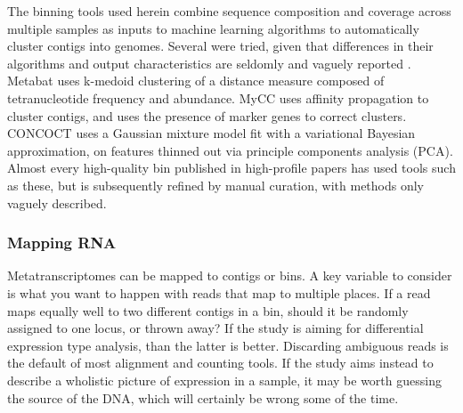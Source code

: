 The binning tools used herein combine sequence composition and coverage across multiple samples as inputs to machine learning algorithms to automatically cluster contigs into genomes.
Several were tried, given that differences in their algorithms and output characteristics are seldomly and vaguely reported \cite{sangwan2016}.
Metabat \cite{metabat2015} uses k-medoid clustering of a distance measure composed of tetranucleotide frequency and abundance.
MyCC \cite{mycc2016} uses affinity propagation to cluster contigs, and uses the presence of marker genes to correct clusters.
CONCOCT \cite{concoct2014} uses a Gaussian mixture model fit with a variational Bayesian approximation, on features thinned out via principle components analysis (PCA).
Almost every high-quality bin published in high-profile papers has used tools such as these, but is subsequently refined by manual curation, with methods only vaguely described.

\subsubsection{Mapping RNA}
Metatranscriptomes can be mapped to contigs or bins.
A key variable to consider is what you want to happen with reads that map to multiple places.
If a read maps equally well to two different contigs in a bin, should it be randomly assigned to one locus, or thrown away?
If the study is aiming for differential expression type analysis, than the latter is better.
Discarding ambiguous reads is the default of most alignment and counting tools.
If the study aims instead to describe a wholistic picture of expression in a sample, it may be worth guessing the source of the DNA, which will certainly be wrong some of the time.


